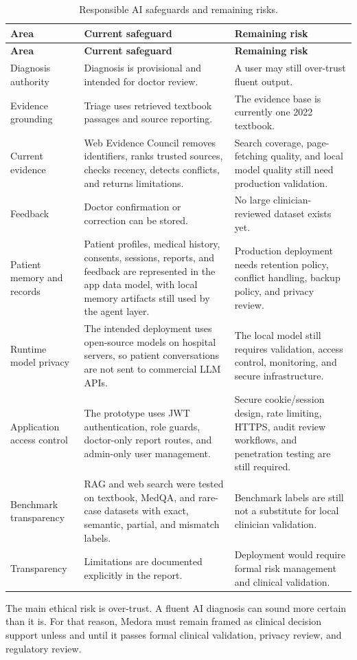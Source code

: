 \begin{longtable}{p{} p{} p{}}
\caption{Responsible AI safeguards and remaining risks.}
\label{tab:responsible_ai_safeguards}\\
\toprule
\textbf{Area} & \textbf{Current safeguard} & \textbf{Remaining risk}\\
\midrule
\endfirsthead
\toprule
\textbf{Area} & \textbf{Current safeguard} & \textbf{Remaining risk}\\
\midrule
\endhead
Diagnosis authority & Diagnosis is provisional and intended for doctor review. & A user may still over-trust fluent output.\\
Evidence grounding & Triage uses retrieved textbook passages and source reporting. & The evidence base is currently one 2022 textbook.\\
Current evidence & Web Evidence Council removes identifiers, ranks trusted sources, checks recency, detects conflicts, and returns limitations. & Search coverage, page-fetching quality, and local model quality still need production validation.\\
Feedback & Doctor confirmation or correction can be stored. & No large clinician-reviewed dataset exists yet.\\
Patient memory and records & Patient profiles, medical history, consents, sessions, reports, and feedback are represented in the app data model, with local memory artifacts still used by the agent layer. & Production deployment needs retention policy, conflict handling, backup policy, and privacy review.\\
Runtime model privacy & The intended deployment uses open-source models on hospital servers, so patient conversations are not sent to commercial LLM APIs. & The local model still requires validation, access control, monitoring, and secure infrastructure.\\
Application access control & The prototype uses JWT authentication, role guards, doctor-only report routes, and admin-only user management. & Secure cookie/session design, rate limiting, HTTPS, audit review workflows, and penetration testing are still required.\\
Benchmark transparency & RAG and web search were tested on textbook, MedQA, and rare-case datasets with exact, semantic, partial, and mismatch labels. & Benchmark labels are still not a substitute for local clinician validation.\\
Transparency & Limitations are documented explicitly in the report. & Deployment would require formal risk management and clinical validation.\\
\bottomrule
\end{longtable}

The main ethical risk is over-trust. A fluent AI diagnosis can sound more certain than it is. For that reason, Medora must remain framed as clinical decision support unless and until it passes formal clinical validation, privacy review, and regulatory review.
